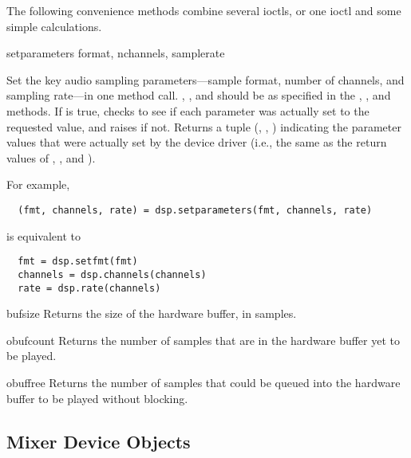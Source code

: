 The following convenience methods combine several ioctls, or one ioctl
and some simple calculations.

\begin{methoddesc}{setparameters}
  {format, nchannels, samplerate }

Set the key audio sampling parameters---sample format, number of
channels, and sampling rate---in one method call.  , 
, and  should be as specified in the
, , and  
methods.  If  is true,  checks to
see if each parameter was actually set to the requested value, and
raises  if not.  Returns a tuple (,
, ) indicating the parameter values that
were actually set by the device driver (i.e., the same as the return
values of , , and ).

For example,
\begin{verbatim}
  (fmt, channels, rate) = dsp.setparameters(fmt, channels, rate)
\end{verbatim}
is equivalent to
\begin{verbatim}
  fmt = dsp.setfmt(fmt)
  channels = dsp.channels(channels)
  rate = dsp.rate(channels)
\end{verbatim}
\end{methoddesc}

\begin{methoddesc}{bufsize}{}
Returns the size of the hardware buffer, in samples.
\end{methoddesc}

\begin{methoddesc}{obufcount}{}
Returns the number of samples that are in the hardware buffer yet to be
played.
\end{methoddesc}

\begin{methoddesc}{obuffree}{}
Returns the number of samples that could be queued into the hardware
buffer to be played without blocking.
\end{methoddesc}

\subsection{Mixer Device Objects \label{mixer-device-objects}}

